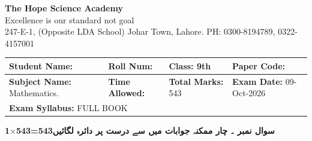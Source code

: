 \documentclass[11pt,a4paper]{article}
\newcommand{\lr}[1]{\beginL #1\endL}
\begin{document}
\begin{center}
  {\Huge\bfseries The Hope Science Academy}\\[3pt]
  {\small Excellence is our standard not goal}\\[2pt]
  {\small 247-E-1, (Opposite LDA School) Johar Town, Lahore. PH: 0300-8194789, 0322-4157001}
\end{center}

\medskip
\noindent
\begin{tabularx}{\linewidth}{|X|X|X|X|}
\hline
\textbf{Student Name:} & \textbf{Roll Num:} & \textbf{Class:} 9th & \textbf{Paper Code:} \\ \hline
\textbf{Subject Name:} Mathematics. & \textbf{Time Allowed:} & \textbf{Total Marks:} 543 & \textbf{Exam Date:} 09-Oct-2026 \\ \hline
\multicolumn{4}{|l|}{\textbf{Exam Syllabus:} FULL BOOK} \\ \hline
\end{tabularx}

\bigskip
\noindent\textbf{1$\times$543=543}\hfill{\urdufont\beginR\textbf{سوال نمبر \lr{1}۔ چار ممکنہ جوابات میں سے درست پر دائرہ لگائیں}\endR}
\end{document}

